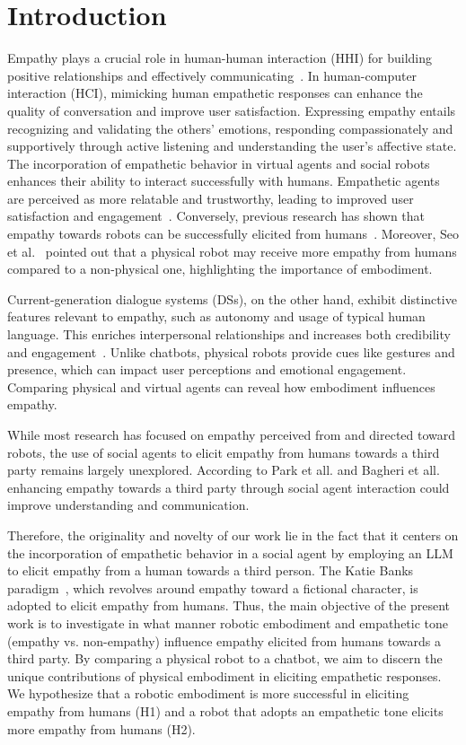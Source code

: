 \documentclass[runningheads]{llncs}
\begin{document}
\section{Introduction}
\vspace{-0.5em}
Empathy plays a crucial role in human-human interaction (HHI) for building positive relationships and effectively communicating~\cite{fuller}. In human-computer interaction (HCI), mimicking human empathetic responses can enhance the quality of conversation and improve user satisfaction. Expressing empathy entails recognizing and validating the others' emotions, responding compassionately and supportively through active listening and understanding the user's affective state. The incorporation of empathetic behavior in virtual agents and social robots enhances their ability to interact successfully with humans. Empathetic agents are perceived as more relatable and trustworthy, leading to improved user satisfaction and engagement~\cite{bagheri2021}. Conversely, previous research has shown that empathy towards robots can be successfully elicited from humans~\cite{seo,frederiksen}. Moreover, Seo et al.~\cite{seo} pointed out that a physical robot may receive more empathy from humans compared to a non-physical one, highlighting the importance of embodiment.

Current-generation dialogue systems (DSs), on the other hand, exhibit distinctive features relevant to empathy, such as autonomy and usage of typical human language. This enriches interpersonal relationships and increases both credibility and engagement~\cite{chaves}. Unlike chatbots, physical robots provide cues like gestures and presence, which can impact user perceptions and emotional engagement. Comparing physical and virtual agents can reveal how embodiment influences empathy.

While most research has focused on empathy perceived from and directed toward robots, the use of social agents to elicit empathy from humans towards a third party remains largely unexplored. According to Park et all. and Bagheri et all.~\cite{park,bagheri2023} enhancing empathy towards a third party through social agent interaction could improve understanding and communication.

Therefore, the originality and novelty of our work lie in the fact that it centers on the incorporation of empathetic behavior in a social agent by employing an LLM to elicit empathy from a human towards a third person. The Katie Banks paradigm~\cite{coke}, which revolves around empathy toward a fictional character, is adopted to elicit empathy from humans. Thus, the main objective of the present work is to investigate in what manner robotic embodiment and empathetic tone (empathy vs. non-empathy) influence empathy elicited from humans towards a third party. By comparing a physical robot to a chatbot, we aim to discern the unique contributions of physical embodiment in eliciting empathetic responses. We hypothesize that a robotic embodiment is more successful in eliciting empathy from humans (H1) and  a robot that adopts an empathetic tone elicits more empathy from humans (H2).
\end{document}
